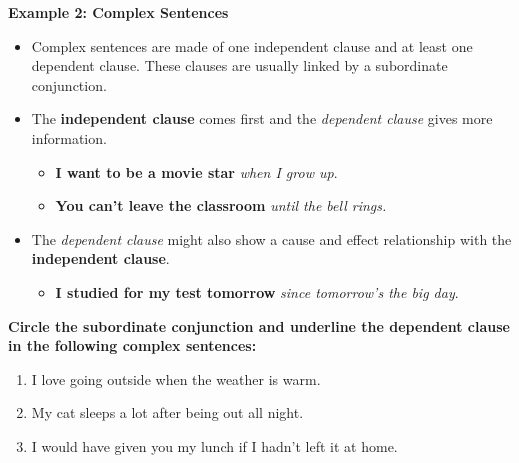 \documentclass[12pt]{article}
\begin{document}
\vspace{1em}


\begin{tcolorbox}[colframe=black!60, colback=white, 
coltitle=black, colbacktitle=black!15, fonttitle=\bfseries\Large, 
title=Examples, halign title=center, left=10pt, right=10pt, top=10pt, bottom=15pt]
\textbf{Example 2: Complex Sentences}
\begin{itemize}
    \item Complex sentences are made of one independent clause and at least one dependent clause. These clauses are usually linked by a subordinate conjunction.
    \item The \textbf{independent clause} comes first and the \textit{dependent clause} gives more information.
    \begin{itemize}
        \item \textbf{I want to be a movie star} \textit{when I grow up}.
        \item \textbf{You can't leave the classroom} \textit{until the bell rings.}
    \end{itemize}
\item The \textit{dependent clause} might also show a cause and effect relationship with the \textbf{independent clause}.
\begin{itemize}
    \item \textbf{I studied for my test tomorrow} \textit{since tomorrow's the big day}.
\end{itemize}
\end{itemize}

     \end{tcolorbox}

\vspace{1em}

\begin{tcolorbox}[colframe=black!60, colback=white, 
coltitle=black, colbacktitle=black!15, fonttitle=\bfseries\Large, 
title=Guided Practice, halign title=center, left=10pt, right=10pt, top=10pt, bottom=15pt]
\textbf{Circle the subordinate conjunction and underline the dependent clause in the following complex sentences:}
\begin{enumerate}[itemsep=1em] %
    \item I love going outside when the weather is warm.
    \item My cat sleeps a lot after being out all night.
    \item I would have given you my lunch if I hadn't left it at home.

\end{enumerate}
\end{tcolorbox}
\end{document}
